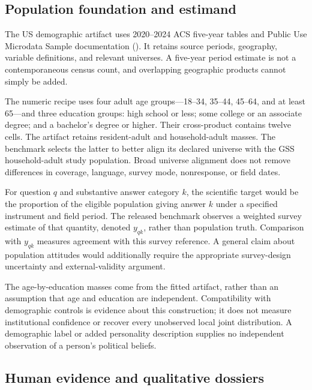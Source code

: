 \documentclass[
  11pt,
]{article}
\begin{document}
\subsection{Population foundation and
estimand}\label{population-foundation-and-estimand}

The US demographic artifact uses 2020--2024 ACS five-year tables and
Public Use Microdata Sample documentation (). It retains source periods, geography, variable
definitions, and relevant universes. A five-year period estimate is not
a contemporaneous census count, and overlapping geographic products
cannot simply be added.

The numeric recipe uses four adult age groups---18--34, 35--44, 45--64,
and at least 65---and three education groups: high school or less; some
college or an associate degree; and a bachelor's degree or higher. Their
cross-product contains twelve cells. The artifact retains resident-adult
and household-adult masses. The benchmark selects the latter to better
align its declared universe with the GSS household-adult study
population. Broad universe alignment does not remove differences in
coverage, language, survey mode, nonresponse, or field dates.

For question \(q\) and substantive answer category \(k\), the scientific
target would be the proportion of the eligible population giving answer
\(k\) under a specified instrument and field period. The released
benchmark observes a weighted survey estimate of that quantity, denoted
\(y_{qk}\), rather than population truth. Comparison with \(y_{qk}\)
measures agreement with this survey reference. A general claim about
population attitudes would additionally require the appropriate
survey-design uncertainty and external-validity argument.

The age-by-education masses come from the fitted artifact, rather than
an assumption that age and education are independent. Compatibility with
demographic controls is evidence about this construction; it does not
measure institutional confidence or recover every unobserved local joint
distribution. A demographic label or added personality description
supplies no independent observation of a person's political beliefs.

\subsection{Human evidence and qualitative
dossiers}\label{human-evidence-and-qualitative-dossiers}
\end{document}
